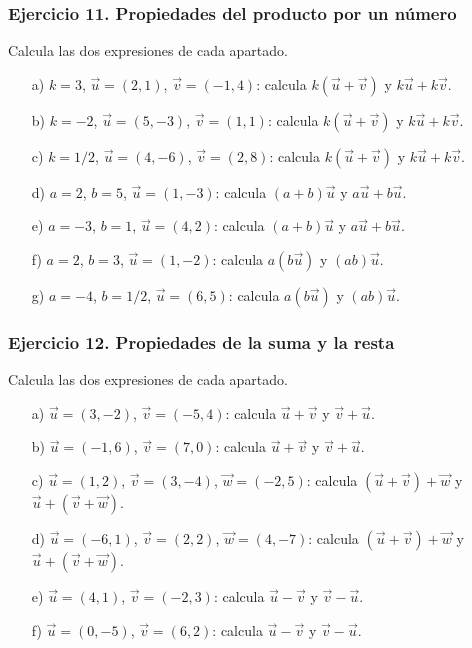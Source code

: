 \subsubsection*{Ejercicio 11. Propiedades del producto por un número}

Calcula las dos expresiones de cada apartado.

\begin{enumerate}
    \item[a)] $k=3$, $\vec{u}=(2,1)$, $\vec{v}=(-1,4)$:
    calcula $k(\vec{u}+\vec{v})$ y $k\vec{u}+k\vec{v}$.

    \item[b)] $k=-2$, $\vec{u}=(5,-3)$, $\vec{v}=(1,1)$:
    calcula $k(\vec{u}+\vec{v})$ y $k\vec{u}+k\vec{v}$.

    \item[c)] $k=1/2$, $\vec{u}=(4,-6)$, $\vec{v}=(2,8)$:
    calcula $k(\vec{u}+\vec{v})$ y $k\vec{u}+k\vec{v}$.

    \item[d)] $a=2$, $b=5$, $\vec{u}=(1,-3)$:
    calcula $(a+b)\vec{u}$ y $a\vec{u}+b\vec{u}$.

    \item[e)] $a=-3$, $b=1$, $\vec{u}=(4,2)$:
    calcula $(a+b)\vec{u}$ y $a\vec{u}+b\vec{u}$.

    \item[f)] $a=2$, $b=3$, $\vec{u}=(1,-2)$:
    calcula $a(b\vec{u})$ y $(ab)\vec{u}$.

    \item[g)] $a=-4$, $b=1/2$, $\vec{u}=(6,5)$:
    calcula $a(b\vec{u})$ y $(ab)\vec{u}$.
\end{enumerate}

\subsubsection*{Ejercicio 12. Propiedades de la suma y la resta}

Calcula las dos expresiones de cada apartado.

\begin{enumerate}
    \item[a)] $\vec{u}=(3,-2)$, $\vec{v}=(-5,4)$:
    calcula $\vec{u}+\vec{v}$ y $\vec{v}+\vec{u}$.

    \item[b)] $\vec{u}=(-1,6)$, $\vec{v}=(7,0)$:
    calcula $\vec{u}+\vec{v}$ y $\vec{v}+\vec{u}$.

    \item[c)] $\vec{u}=(1,2)$, $\vec{v}=(3,-4)$, $\vec{w}=(-2,5)$:
    calcula $(\vec{u}+\vec{v})+\vec{w}$ y $\vec{u}+(\vec{v}+\vec{w})$.

    \item[d)] $\vec{u}=(-6,1)$, $\vec{v}=(2,2)$, $\vec{w}=(4,-7)$:
    calcula $(\vec{u}+\vec{v})+\vec{w}$ y $\vec{u}+(\vec{v}+\vec{w})$.

    \item[e)] $\vec{u}=(4,1)$, $\vec{v}=(-2,3)$:
    calcula $\vec{u}-\vec{v}$ y $\vec{v}-\vec{u}$.

    \item[f)] $\vec{u}=(0,-5)$, $\vec{v}=(6,2)$:
    calcula $\vec{u}-\vec{v}$ y $\vec{v}-\vec{u}$.
\end{enumerate}

